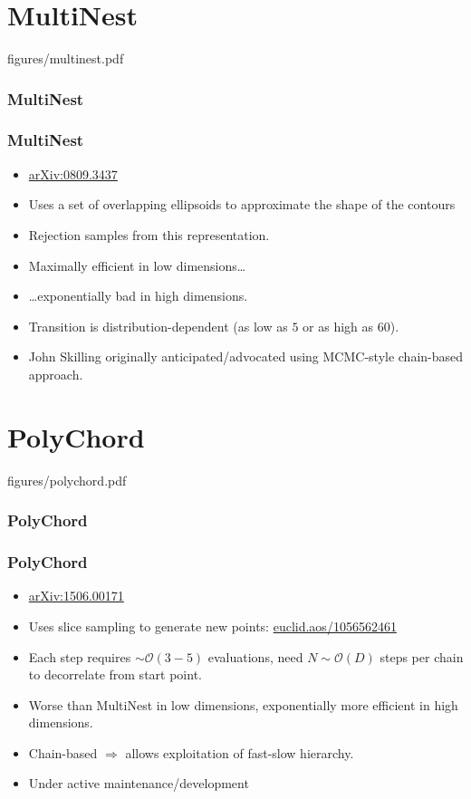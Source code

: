 \documentclass[%
    handout
]{beamer}
\begin{document}
\section{MultiNest}
\begin{multifig}{figures/multinest.pdf}
    \frametitle{MultiNest}
\end{multifig}
\begin{frame}
    \frametitle{MultiNest} 
    \begin{itemize}
        \item \href{https://arxiv.org/abs/0809.3437}{arXiv:0809.3437} 
        \item Uses a set of overlapping ellipsoids to approximate the shape of the contours
        \item Rejection samples from this representation.
        \item Maximally efficient in low dimensions\ldots
        \item \ldots exponentially bad in high dimensions.
        \item Transition is distribution-dependent (as low as $5$ or as high as $60$).
        \item John Skilling originally anticipated/advocated using MCMC-style chain-based approach.
    \end{itemize}
\end{frame}

\section{PolyChord}
\begin{multifig}{figures/polychord.pdf}
    \frametitle{PolyChord}
\end{multifig}

\begin{frame}
    \frametitle{PolyChord} 
    \begin{itemize}
        \item \href{https://arxiv.org/abs/1506.00171}{arXiv:1506.00171}
        \item Uses slice sampling to generate new points: \href{https://projecteuclid.org/euclid.aos/1056562461}{euclid.aos/1056562461} 
        \item Each step requires $\sim\mathcal{O}(3-5)$ evaluations, need $N\sim\mathcal{O}(D)$ steps per chain to decorrelate from start point.
        \item Worse than MultiNest in low dimensions, exponentially more efficient in high dimensions.
        \item Chain-based $\Rightarrow$ allows exploitation of fast-slow hierarchy.
        \item Under active maintenance/development
    \end{itemize}
\end{frame}
\end{document}

